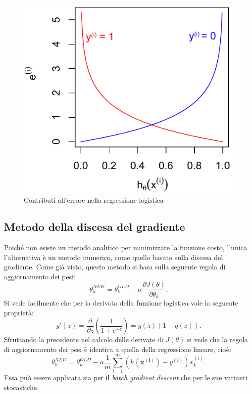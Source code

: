 \begin{figure}[]
\centering
  \includegraphics[width=0.5\columnwidth]{images/errori_logistica}
  \caption{Contributi all'errore nella regressione logistica}
  \label{fig:errori_logistica}
\end{figure}

\subsection{Metodo della discesa del gradiente}
Poiché non esiste un metodo analitico per minimizzare la funzione costo, l'unica l'alternativa è un metodo numerico, come quello basato sulla discesa del gradiente. Come già visto, questo metodo si basa sulla seguente regola di aggiornamento dei pesi:
\begin{equation*}
  \theta_k^{NEW} = \theta_k^{OLD} - \alpha \frac{ \partial J(\theta)}{ \partial \theta_k}.
\end{equation*}
Si vede facilmente che per la derivata della funzione logistica vale la seguente proprietà:
\begin{equation*}
g'(z) = \frac{\partial}{\partial z}\left( \frac{1}{1+e^{-z}}\right)=g(z)(1-g(z)).
\end{equation*}
Sfruttando la precedente nel calcolo delle derivate di $J(\theta)$ si vede che la regola di aggiornamento dei pesi è identica a quella della regressione lineare, cioè:
\begin{equation*}
   \theta_k^{NEW} = \theta_k^{OLD} - \alpha \frac{1}{m} \sum_{i=1}^m (h(\mathbf{x^{(i)}})-y^{(i)}) x^{(i)}_k.\end{equation*}
Essa può essere applicata sia per il \emph{batch gradient descent} che per le sue varianti stocastiche.

